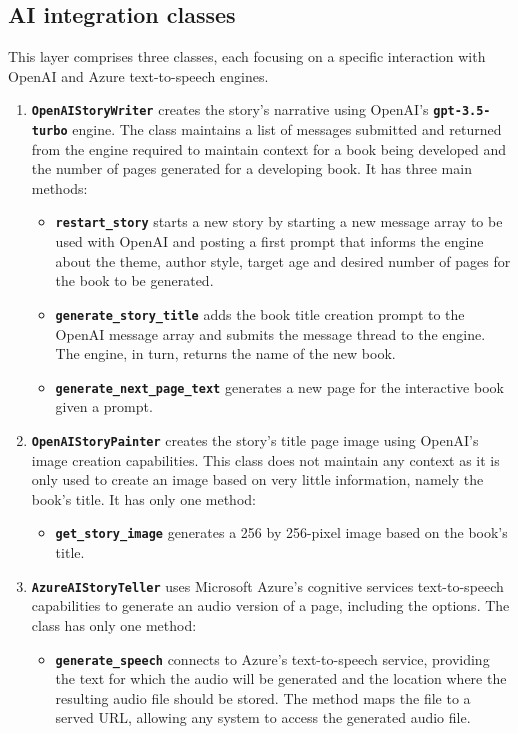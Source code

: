 \documentclass[conference]{IEEEtran}
\begin{document}
	\subsection{AI integration classes}
	
	This layer comprises three classes, each focusing on a specific interaction with OpenAI and Azure text-to-speech engines.
	
	\begin{enumerate}
		\item \textbf{\texttt{OpenAIStoryWriter}} creates the story's narrative using OpenAI's \textbf{\texttt{gpt-3.5-turbo}} engine. The class maintains a list of messages submitted and returned from the engine required to maintain context for a book being developed and the number of pages generated for a developing book. It has three main methods:
		\begin{itemize}
			\item\textbf{\texttt{restart\_story}} starts a new story by starting a new message array to be used with OpenAI and posting a first prompt that informs the engine about the theme, author style, target age and desired number of pages for the book to be generated.
			\item\textbf{\texttt{generate\_story\_title}} adds the book title creation prompt to the OpenAI message array and submits the message thread to the engine. The engine, in turn, returns the name of the new book.
			\item\textbf{\texttt{generate\_next\_page\_text}} generates a new page for the interactive book given a prompt.
		\end{itemize}
		\item\textbf{\texttt{OpenAIStoryPainter}} creates the story's title page image using OpenAI's image creation capabilities. This class does not maintain any context as it is only used to create an image based on very little information, namely the book's title. It has only one method:
		\begin{itemize}
			\item\textbf{\texttt{get\_story\_image}} generates a 256 by 256-pixel image based on the book's title.
		\end{itemize}
		\item\textbf{\texttt{AzureAIStoryTeller}} uses Microsoft Azure's cognitive services text-to-speech capabilities to generate an audio version of a page, including the options. The class has only one method:
		\begin{itemize}
			\item\textbf{\texttt{generate\_speech}} connects to Azure's text-to-speech service, providing the text for which the audio will be generated and the location where the resulting audio file should be stored. The method maps the file to a served URL, allowing any system to access the generated audio file.
		\end{itemize}
	\end{enumerate}
	
\end{document}
